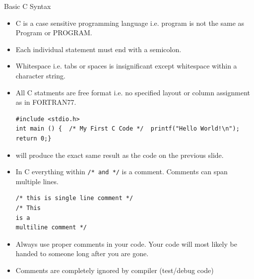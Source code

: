 \documentclass[10pt,t]{beamer}
\begin{document}
\begin{frame}{Basic C Syntax}
  \begin{itemize}
  \item C is a case sensitive programming language i.e. program is not the same as Program or PROGRAM.
  \item Each individual statement must end with a semicolon. 
  \item Whitespace i.e. tabs or spaces is insignificant except whitespace within a character string.
  \item All C statments are free format i.e. no specified layout or column assignment as in FORTRAN77.
    \begin{lstlisting}[basicstyle=\scriptsize\ttfamily]
#include <stdio.h>
int main () {  /* My First C Code */  printf("Hello World!\n");  return 0;}
    \end{lstlisting}
  \item[] will produce the exact same result as the code on the previous slide.
  \item In C everything within \lstinline[basicstyle=\scriptsize\ttfamily]|/* and */| is a comment. Comments can span multiple lines.
    \begin{lstlisting}[basicstyle=\scriptsize\ttfamily]
/* this is single line comment */
/* This
is a 
multiline comment */
    \end{lstlisting}
  \item Always use proper comments in your code. Your code will most likely be handed to someone long after you are gone.
  \item Comments are completely ignored by compiler (test/debug code)
  \end{itemize}
\end{frame}
\end{document}
